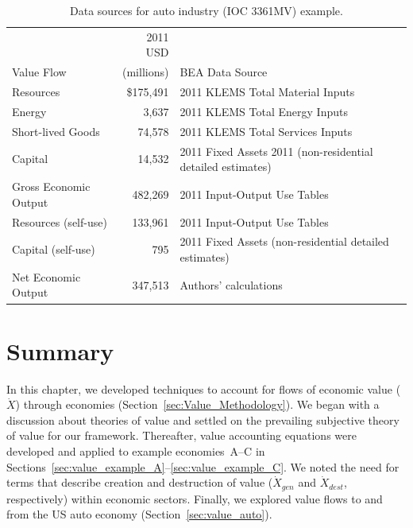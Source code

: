 \begin{table}
\caption[Data Sources for auto industry (IOC 3361MV) example]{Data sources for auto industry (IOC 3361MV) example.}
\begin{center}
  \begin{tabular}{l r @{\hspace{2em}} l}
   \toprule 
     & 2011 USD &   \\ 
Value Flow & (millions) & BEA Data Source \\
	\midrule
    Resources  & \$175,491           & 2011 KLEMS Total Material Inputs \\

   Energy &   3,637&   2011 KLEMS Total Energy Inputs                \\

    Short-lived Goods &   74,578 &   2011 KLEMS Total Services Inputs    \\
    Capital & 14,532  &  2011 Fixed Assets 2011 (non-residential detailed estimates)     \\  

    Gross Economic Output & 482,269  &   2011 Input-Output Use Tables \\

    Resources (self-use)  &  133,961 & 2011 Input-Output Use Tables     \\
    Capital (self-use) & 795 & 2011 Fixed Assets (non-residential detailed estimates)      \\
    Net Economic Output & 347,513   &  Authors' calculations \\
    \bottomrule
  \end{tabular}

\end{center}
\label{tab:data}
\end{table}


\section{Summary}
\label{sec:value_summary}

In this chapter, we developed techniques to account for flows of economic value
($\dot{X}$) through economies 
(Section~\ref{sec:Value_Methodology}).
We began with a discussion about theories of value and settled on
the prevailing subjective theory of value for our framework.
Thereafter, value accounting equations were developed and applied to example
economies~A--C %
in Sections~\ref{sec:value_example_A}--\ref{sec:value_example_C}. 
We noted the need for terms that describe creation and destruction
of value ($\dot{X}_{gen}$ and $\dot{X}_{dest}$, respectively) 
within economic sectors.
Finally, we explored value flows 
to and from the US auto economy (Section~\ref{sec:value_auto}).


